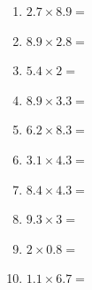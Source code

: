 \documentclass[12pt]{article}
\begin{document}
\begin{enumerate}
\newpage
\item \large $ 2.7 \times 8.9 = $ \vspace{1.5cm}
\item \large $ 8.9 \times 2.8 = $ \vspace{1.5cm}
\item \large $ 5.4 \times 2 = $ \vspace{1.5cm}
\item \large $ 8.9 \times 3.3 = $ \vspace{1.5cm}
\item \large $ 6.2 \times 8.3 = $ \vspace{1.5cm}
\item \large $ 3.1 \times 4.3 = $ \vspace{1.5cm}
\item \large $ 8.4 \times 4.3 = $ \vspace{1.5cm}
\item \large $ 9.3 \times 3 = $ \vspace{1.5cm}
\item \large $ 2 \times 0.8 = $ \vspace{1.5cm}
\item \large $ 1.1 \times 6.7 = $ \vspace{1.5cm}
\end{enumerate}\newpage
\end{document}
